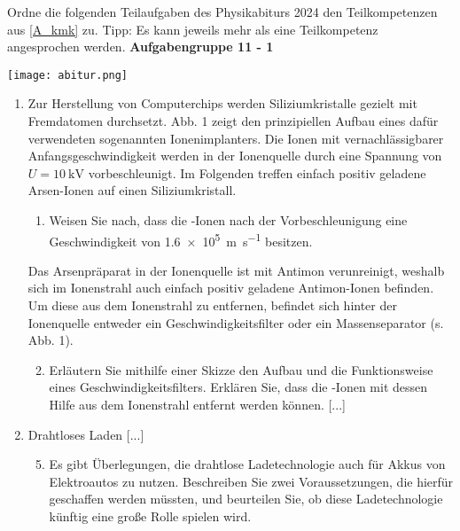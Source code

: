 \begin{uea}
	Ordne die folgenden Teilaufgaben des Physikabiturs 2024 den Teilkompetenzen aus \cref{A_kmk} zu. Tipp: Es kann jeweils mehr als eine Teilkompetenz angesprochen werden.
	\bip
	\textbf{Aufgabengruppe 11 - 1}
	
	\texttt{[image: abitur.png]}
	
	\begin{enumerate}[label = \arabic*)]
		\item Zur Herstellung von Computerchips werden Siliziumkristalle gezielt mit Fremdatomen durchsetzt. Abb. 1 zeigt den prinzipiellen Aufbau eines dafür verwendeten sogenannten Ionenimplanters. Die Ionen mit vernachlässigbarer Anfangsgeschwindigkeit werden in der Ionenquelle durch eine Spannung von $U = \SI{10}{\kilo\volt}$ vorbeschleunigt. Im Folgenden treffen einfach positiv geladene Arsen-Ionen  auf einen Siliziumkristall.
		\begin{enumerate}[label = \alph*)]
			\item Weisen Sie nach, dass die -Ionen nach der Vorbeschleunigung eine Geschwindigkeit von \SI{1,6e5}{\metre\per\second} besitzen.
		\end{enumerate}
		Das Arsenpräparat in der Ionenquelle ist mit Antimon verunreinigt, weshalb sich im Ionenstrahl auch einfach positiv geladene Antimon-Ionen  befinden. Um diese aus dem Ionenstrahl zu entfernen, befindet sich hinter der Ionenquelle entweder ein Geschwindigkeitsfilter oder ein Massenseparator (s. Abb. 1).
		\begin{enumerate}[label = \alph*)]
			\setcounter{enumii}{1}
			\item Erläutern Sie mithilfe einer Skizze den Aufbau und die Funktionsweise eines Geschwindigkeitsfilters. Erklären Sie, dass die -Ionen mit dessen Hilfe aus dem Ionenstrahl entfernt werden können. [...]
		\end{enumerate}
		\item Drahtloses Laden [...]
		\begin{enumerate}[label = \alph*)]
			\setcounter{enumii}{4}
			\item Es gibt Überlegungen, die drahtlose Ladetechnologie auch für Akkus von Elektroautos zu nutzen. Beschreiben Sie zwei Voraussetzungen, die hierfür geschaffen werden müssten, und beurteilen Sie, ob diese Ladetechnologie künftig eine große Rolle spielen wird.
		\end{enumerate}
	\end{enumerate}
\end{uea}




